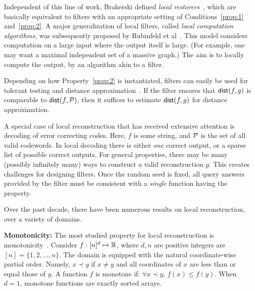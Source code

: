 \documentclass[natbib]{svcyclop}
\def\dist{{\sf dist}}
\begin{document}
Independent of this line of work, Brakerski defined \emph{local restorers}~\cite{Br08}, which are basically
equivalent to filters with an appropriate setting of Conditions~\ref{prop:1} and~\ref{prop:2}.
A major generalization of local filters, called \emph{local computation algorithms}, was subsequently proposed
by Rubinfeld et al~\cite{RuTaVa+11}. This model considers computation on a large input where the output itself
is large. (For example, one may want a maximal independent set of a massive graph.) 
The aim is to locally compute the output, by an algorithm akin to a filter.

Depending on how Property~\ref{prop:2} is instantiated, filters
can easily be used for tolerant testing and distance approximation~\cite{PRR04}. If the filter ensures
that $\dist(f,g)$ is comparable to $\dist(f,\cP)$, then it suffices to estimate $\dist(f,g)$
for distance approximation. 
%

A special case of local reconstruction that has received extensive attention is decoding of error correcting codes. 
Here, $f$ is some string, and $\mathcal{P}$ is the set of all valid codewords. 
In local decoding there is either \emph{one} correct output, or 
a sparse list of possible correct outputs. For general properties,
there may be many (possibly infinitely many) ways
to construct a valid reconstruction $g$. This creates challenges
for designing filters. Once the random seed is fixed, all query answers
provided by the filter must be consistent with a {\em single} function
having the property.



\KeyRes

Over the past decade, there have been numerous results on local reconstruction,
over a variety of domains. 

{\bf Monotonicity:} The most studied property for local reconstruction
is monotonicity~\cite{ACCL2,SS06,BhGr+12,AwJh+12}. Consider $f:[n]^d \mapsto \mathbb{R}$,
where $d,n$ are positive integers are $[n] = \{1,2,\ldots,n\}$. The domain
is equipped with the natural coordinate-wise partial order. Namely, $x \prec y$
if $x \neq y$ and all coordinates of $x$ are less than or equal those of $y$. A function $f$
is monotone if: $\forall x \prec y$, $f(x) \leq f(y)$. When $d=1$,
monotone functions are exactly sorted arrays.
\end{document}

